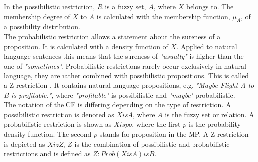 \documentclass[conference]{IEEEtran}
\begin{document}
In the possibilistic restriction, \begin{math} R \end{math} is a fuzzy set, \begin{math} A \end{math}, where \begin{math} X \end{math} belongs to. The membership degree of \begin{math} X \end{math} to \begin{math} A \end{math} is calculated with the membership function, \begin{math} \mu_{A} \end{math}, of a possibility distribution.\\
The probabilistic restriction allows a statement about the sureness of a proposition. It is calculated with a density function of \begin{math} X \end{math}. Applied to natural language sentences this means that the sureness of \emph{"usually"} is higher than the one of \emph{"sometimes"}. Probabilistic restrictions rarely occur exclusively in natural language, they are rather combined with possibilistic propositions. This is called a Z-restriction \cite{zadeh2013}. It contains natural language propositions, e.g. \emph{"Maybe Flight A to B is profitable."}, where \emph{"profitable"} is possibilistic and \emph{"maybe"} probabilistic.\\
The notation of the CF is differing depending on the type of restriction. A possibilistic restriction is denoted as \begin{math} X is A \end{math}, where \begin{math} A \end{math} is the fuzzy set or relation. A probabilistic restriction is shown as \begin{math} X isp p \end{math}, where the first \begin{math} p \end{math} is the probability density function. The second \begin{math} p \end{math} stands for proposition in the MP. A Z-restriction is depicted as \begin{math} X iz Z \end{math}, \begin{math} Z \end{math} is the combination of possibilistic and probabilistic restrictions and is defined as \begin{math} Z: Prob(X is A) is B \end{math}.\\
\end{document}
